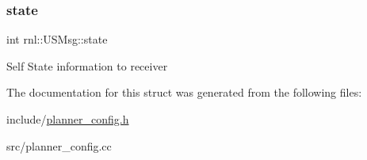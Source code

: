 \subsubsection{\texorpdfstring{state}{state}}
{\footnotesize\ttfamily int rnl\+::\+U\+S\+Msg\+::state}

Self State information to receiver 

The documentation for this struct was generated from the following files\+:\begin{DoxyCompactItemize}
\item 
include/\hyperlink{planner__config_8h}{planner\+\_\+config.\+h}\item 
src/planner\+\_\+config.\+cc\end{DoxyCompactItemize}
